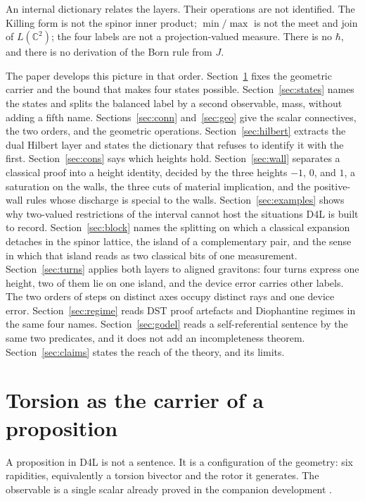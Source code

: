 \documentclass[a4paper]{article}
\theoremstyle{definition}
\begin{document}
An internal dictionary relates the layers. Their operations are not
identified. The Killing form is not the spinor inner product;
\(\min/\max\) is not the meet and join of \(L(\mathbb{C}^2)\); the four
labels are not a projection-valued measure. There is no \(\hbar\), and
there is no derivation of the Born rule from \(J\).

The paper develops this picture in that order. Section~\ref{sec:torsion}
fixes the geometric carrier and the bound that makes four states
possible. Section~\ref{sec:states} names the states and splits the
balanced label by a second observable, mass, without adding a fifth
name. Sections~\ref{sec:conn} and~\ref{sec:geo} give the scalar
connectives, the two orders, and the geometric operations.
Section~\ref{sec:hilbert} extracts the dual Hilbert layer and states
the dictionary that refuses to identify it with the first.
Section~\ref{sec:cons} says which heights hold.
Section~\ref{sec:wall} separates a classical proof into a height
identity, decided by the three heights \(-1\), \(0\), and \(1\), a
saturation on the walls, the three cuts of material implication, and
the positive-wall rules whose discharge is special to the walls. Section~\ref{sec:examples}
shows why two-valued restrictions of the interval cannot host the
situations D4L is built to record. Section~\ref{sec:block} names the
splitting on which a classical expansion detaches in the spinor
lattice, the island of a complementary pair, and the sense in which
that island reads as two classical bits of one measurement.
Section~\ref{sec:turns} applies both layers to aligned gravitons:
four turns express one height, two of them lie on one island, and
the device error carries other labels. The two orders of steps on
distinct axes occupy distinct rays and one device error.
Section~\ref{sec:regime} reads DST proof artefacts and Diophantine
regimes in the same four names. Section~\ref{sec:godel} reads a
self-referential sentence by the same two predicates, and it does not
add an incompleteness theorem. Section~\ref{sec:claims} states the
reach of the theory, and its limits.

\section{Torsion as the carrier of a proposition}
\label{sec:torsion}

A proposition in D4L is not a sentence. It is a configuration of the
geometry: six rapidities, equivalently a torsion bivector and the rotor
it generates. The observable is a single scalar already proved in the
companion development \cite{Diophantine2026}.
\end{document}
